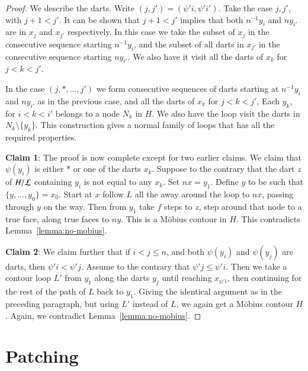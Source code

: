 \begin{proof}
We describe the darts.
Write $(j,j') = (\psi'i,\psi' i')$.
Take the case $j,j'$, with $j+1<j'$. 
It can be shown that $j+1 < j'$ implies that both $n^{-1}
y_i$ and $n y_{i'}$ are in $x_j$ and $x_{j'}$ respectively.
In this case we take the subset
of $x_j$ in the consecutive sequence starting $n^{-1} y_i$, and the
subset of all darts in $x_{j'}$ in the consecutive sequence starting $n y_{i'}$.
We also
have it visit all the darts of $x_k$ for $j<k<j'$.

In the case $(j,*,\ldots,j')$ we form consecutive sequences of darts
starting at $n^{-1} y_i$ and $n y_{i'}$ as in the previous case, and
all the darts of $x_k$ for $j<k<j'$, 
Each $y_k$, for $i < k < i'$ belongs to a node $N_k$ in $H$.
We also have the loop visit the darts in $N_k\setminus\{y_k\}$.
This construction gives a normal family of loops that has all the
required properties.

{\bf Claim 1}:
The proof is now complete except for two earlier claims.  We claim
that $\psi(y_i)$ is either $*$ or one of the darts $x_k$.  Suppose
to the contrary that the dart $z$ of $H/{\cal L}$ containing
$y_i$ is not equal to any $x_k$.
Set $n x = y_1$.  Define $y$ to be such
that $\{y,\ldots,y_0\} = x_0$. Start at $x$ follow $L$ all the away
around the loop to $n x$, passing through $y$ on the way.  Then from
$y_1$ take $f$ steps to $z$, step around that node to a true face,
along true faces to $n y$.  This is a M\"obius contour in 
$H$.  This contradicts Lemma~\ref{lemma:no-mobius}.

{\bf Claim 2}:
We claim further that if $i<j\le n$, and both $\psi(y_i)$ and
$\psi(y_j)$ are darts, then $\psi' i < \psi' j$.  Assume to the
contrary that $\psi' j \le \psi' i$.  Then we take a contour loop
$L'$ from $y_1$ along the darts $y_j$ until reaching $x_{\psi' i}$,
then continuing for the rest of the path of $L$ back to $y_1$.
Giving the identical argument as in the preceding paragraph, but
using $L'$ instead of $L$, we again get a M\"obius contour $H$.  
Again, we contradict Lemma~\ref{lemma:no-mobius}.
\end{proof}



\section{Patching}\label{sec:patch}


